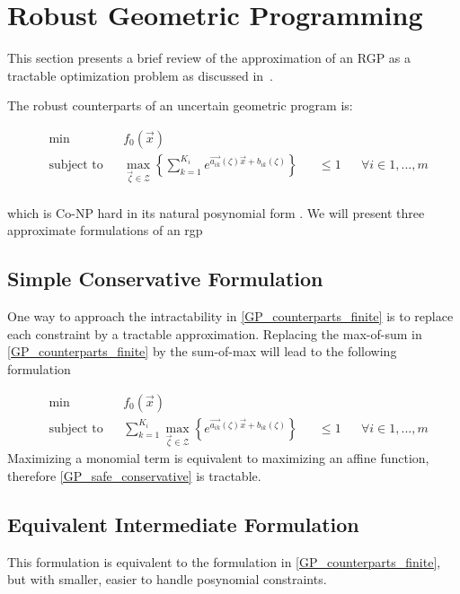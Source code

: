 \section{Robust Geometric Programming} \label{RGP}
This section presents a brief review of the approximation of an RGP as a tractable optimization problem as discussed in~\cite{Saab2018}.

The robust counterparts of an uncertain geometric program is:

\begin{equation}
\begin{aligned}
& \min &&f_0\left(\vec{x}\right)\\
& \text{subject to} &&\max_{\vec{\zeta} \in \mathcal{Z}} \left\{\textstyle{\sum}_{k=1}^{K_i}e^{\vec{a_{ik}}\left(\zeta\right)\vec{x} + b_{ik}\left(\zeta\right)}\right\} &&\leq 1 &&\forall i \in 1,...,m\\
\end{aligned}
\label{GP_counterparts_finite}
\end{equation}

which is Co-NP hard in its natural posynomial form \cite{RGPcoNP}. We will present three approximate formulations of an \gls{rgp}

\subsection{Simple Conservative Formulation}
One way to approach the intractability in \eqref{GP_counterparts_finite} is to replace each constraint by a tractable approximation. Replacing the max-of-sum in \eqref{GP_counterparts_finite} by the sum-of-max will lead to the following formulation

\begin{equation}
\begin{aligned}
& \min &&f_0\left(\vec{x}\right)\\
& \text{subject to} &&\textstyle{\sum}_{k=1}^{K_i} {\displaystyle \max_{\vec{\zeta} \in \mathcal{Z}}} \left\{e^{\vec{a_{ik}}\left(\zeta\right)\vec{x} + b_{ik}\left(\zeta\right)}\right\} &&\leq 1 &&\forall i \in 1,...,m
\end{aligned}
\label{GP_safe_conservative}
\end{equation}
Maximizing a monomial term is equivalent to maximizing an affine function, therefore \eqref{GP_safe_conservative} is tractable.

\subsection{Equivalent Intermediate Formulation}
This formulation is equivalent to the formulation in \eqref{GP_counterparts_finite}, but with smaller, easier to handle posynomial constraints.

